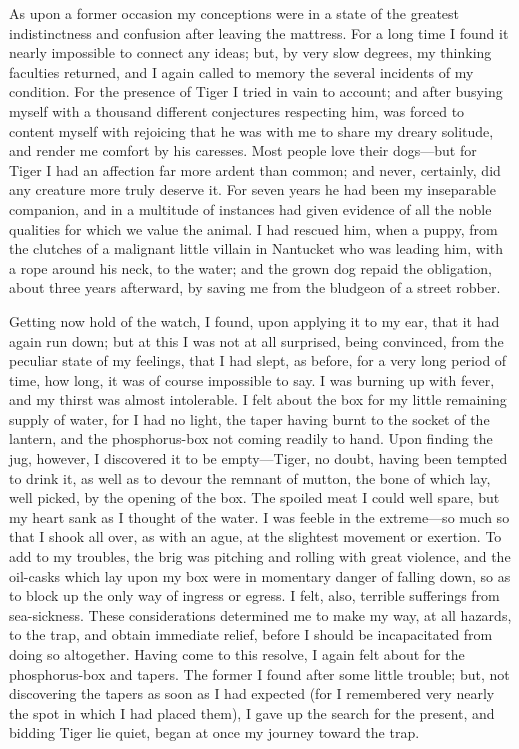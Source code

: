 As upon a former occasion my conceptions were in a state of the greatest
indistinctness and confusion after leaving the mattress. For a long time I found
it nearly impossible to connect any ideas; but, by very slow degrees, my
thinking faculties returned, and I again called to memory the several incidents
of my condition. For the presence of Tiger I tried in vain to account; and after
busying myself with a thousand different conjectures respecting him, was forced
to content myself with rejoicing that he was with me to share my dreary
solitude, and render me comfort by his caresses. Most people love their
dogs---but for Tiger I had an affection far more ardent than common; and never,
certainly, did any creature more truly deserve it. For seven years he had been
my inseparable companion, and in a multitude of instances had given evidence of
all the noble qualities for which we value the animal. I had rescued him, when a
puppy, from the clutches of a malignant little villain in Nantucket who was
leading him, with a rope around his neck, to the water; and the grown dog repaid
the obligation, about three years afterward, by saving me from the bludgeon of a
street robber. 

Getting now hold of the watch, I found, upon applying it to my ear, that it
had again run down; but at this I was not at all surprised, being convinced,
from the peculiar state of my feelings, that I had slept, as before, for a very
long period of time, how long, it was of course impossible to say. I was burning
up with fever, and my thirst was almost intolerable. I felt about the box for my
little remaining supply of water, for I had no light, the taper having burnt to
the socket of the lantern, and the phosphorus-box not coming readily to hand.
Upon finding the jug, however, I discovered it to be empty---Tiger, no doubt,
having been tempted to drink it, as well as to devour the remnant of mutton, the
bone of which lay, well picked, by the opening of the box. The spoiled meat I
could well spare, but my heart sank as I thought of the water. I was feeble in
the extreme---so much so that I shook all over, as with an ague, at the
slightest movement or exertion. To add to my troubles, the brig was pitching and
rolling with great violence, and the oil-casks which lay upon my box were in
momentary danger of falling down, so as to block up the only way of ingress or
egress. I felt, also, terrible sufferings from sea-sickness. These
considerations determined me to make my way, at all hazards, to the trap, and
obtain immediate relief, before I should be incapacitated from doing so
altogether. Having come to this resolve, I again felt about for the
phosphorus-box and tapers. The former I found after some little trouble; but,
not discovering the tapers as soon as I had expected (for I remembered very
nearly the spot in which I had placed them), I gave up the search for the
present, and bidding Tiger lie quiet, began at once my journey toward the
trap. 


